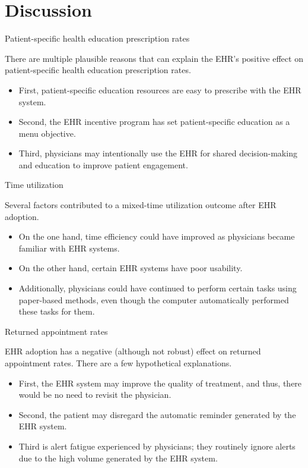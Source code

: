 \documentclass[10pt, compress]{beamer}
\begin{document}
\section{Discussion}

\begin{frame}{Patient-specific health education prescription rates}

     There are multiple plausible reasons that can explain the EHR's positive effect on patient-specific health education prescription rates.
      \begin{itemize}
        \item First, patient-specific education resources are easy to prescribe with the EHR system. 
        \item Second, the EHR incentive program has set patient-specific education as a menu objective. 
        \item Third, physicians may intentionally use the EHR for shared decision-making and education to improve patient engagement. 

      \end{itemize}

\end{frame}

\begin{frame}{Time utilization}

     Several factors contributed to a mixed-time utilization outcome after EHR adoption.
      \begin{itemize}
        \item On the one hand, time efficiency could have improved as physicians became familiar with EHR systems. 
        \item On the other hand, certain EHR systems have poor usability. 
        \item Additionally, physicians could have continued to perform certain tasks using paper-based methods, even though the computer automatically performed these tasks for them.

      \end{itemize}

\end{frame}


\begin{frame}{Returned appointment rates}

     EHR adoption has a negative (although not robust) effect on returned appointment rates. There are a few hypothetical explanations.
      \begin{itemize}
        \item First, the EHR system may improve the quality of treatment, and thus, there would be no need to revisit the physician. 
        \item Second, the patient may disregard the automatic reminder generated by the EHR system. 
        \item Third is alert fatigue experienced by physicians; they routinely ignore alerts due to the high volume generated by the EHR system. 
      \end{itemize}

\end{frame}
\end{document}
